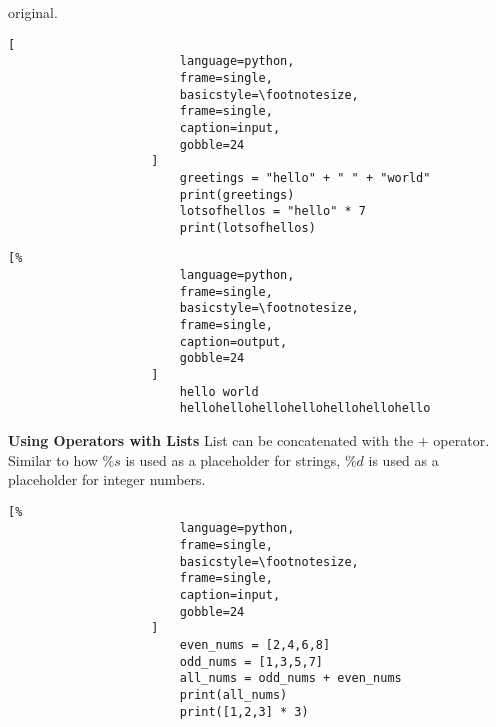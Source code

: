 \documentclass[crop=false,class=article,oneside]{standalone}
\begin{document}
                original.\newline
                \begin{minipage}[t]{.48\textwidth}
                    \centering
                    \begin{lstlisting}[
                        language=python,
                        frame=single,
                        basicstyle=\footnotesize,
                        frame=single,
                        caption=input,
                        gobble=24
                    ]
                        greetings = "hello" + " " + "world"
                        print(greetings)
                        lotsofhellos = "hello" * 7
                        print(lotsofhellos)
                    \end{lstlisting}
                \end{minipage}\hfill
                \begin{minipage}[t]{.48\textwidth}
                    \centering
                    \begin{lstlisting}[%
                        language=python,
                        frame=single,
                        basicstyle=\footnotesize,
                        frame=single,
                        caption=output,
                        gobble=24
                    ]
                        hello world
                        hellohellohellohellohellohellohello
                    \end{lstlisting}
                \end{minipage}
            \textbf{Using Operators with Lists}
                List can be concatenated with the $+$ operator.
                Similar to how $\%s$ is used as a placeholder for
                strings, $\%d$ is used as a placeholder for integer
                numbers.\newline
                \begin{minipage}[t]{.48\textwidth}
                    \centering
                    \begin{lstlisting}[%
                        language=python,
                        frame=single,
                        basicstyle=\footnotesize,
                        frame=single,
                        caption=input,
                        gobble=24
                    ]
                        even_nums = [2,4,6,8]
                        odd_nums = [1,3,5,7]
                        all_nums = odd_nums + even_nums
                        print(all_nums)
                        print([1,2,3] * 3)
                    \end{lstlisting}
                \end{minipage}\hfill
\end{document}
